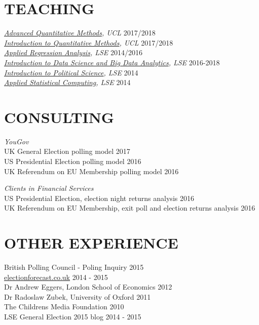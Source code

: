 \documentclass[centered]{res}
\begin{document}
\begin{resume}
\section{TEACHING} 	
{\sl\href{https://uclspp.github.io/PUBLG088/}{Advanced Quantitative Methods}, UCL} \hfill 2017/2018 \\
{\sl\href{http://uclspp.github.io/PUBLG100/}{Introduction to Quantitative Methods}, UCL} \hfill 2017/2018 \\
{\sl\href{http://www.lse.ac.uk/resources/calendar/courseGuides/MY/2014_MY452.htm}{Applied Regression Analysis}, LSE} \hfill 2014/2016 \\
{\sl\href{http://www.lse.ac.uk/study/summerSchools/Methods/Mathematics-&-Statistics/ME114.aspx}{Introduction to Data Science and Big Data Analytics}, LSE} \hfill 2016-2018 \\
{\sl\href{http://www.lse.ac.uk/resources/calendar/courseGuides/GV/2015_GV101.htm}{Introduction to Political Science}, LSE} \hfill 2014 \\	
{\sl\href{http://www.lse.ac.uk/resources/calendar/courseGuides/MY/2014_MY459.htm}{Applied Statistical Computing}, LSE} \hfill 2014 	


\section{CONSULTING} 

{\sl YouGov} \\
                 UK General Election polling model \hfill 2017 \\
                 US Presidential Election polling model \hfill 2016 \\
                 UK Referendum on EU Membership polling model \hfill 2016 
                 
{\sl Clients in Financial Services} \\
                 US Presidential Election, election night returns analysis \hfill 2016 \\
                 UK Referendum on EU Membership, exit poll and election returns analysis \hfill 2016 
	
\section{OTHER EXPERIENCE} 
                 British Polling Council - Poling Inquiry \hfill 2015\\
		\url{electionforecast.co.uk} \hfill 2014 - 2015\\
                Dr Andrew Eggers, London School of Economics \hfill 2012\\
                Dr Radoslaw Zubek, University of Oxford \hfill 2011\\
                The Childrens Media Foundation  \hfill 2010          \\         
                LSE General Election 2015 blog \hfill 2014 - 2015 
               


\end{resume}
\end{document}
